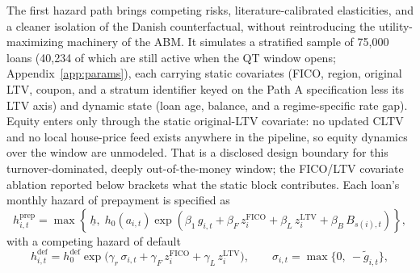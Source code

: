 \documentclass[12pt]{article}
\begin{document}
The first hazard path brings competing risks, literature-calibrated elasticities, and a cleaner isolation of the Danish counterfactual, without reintroducing the utility-maximizing machinery of the ABM. It simulates a stratified sample of 75,000 loans (40,234 of which are still active when the QT window opens; Appendix~\ref{app:params}), each carrying static covariates (FICO, region, original LTV, coupon, and a stratum identifier keyed on the Path A specification less its LTV axis) and dynamic state (loan age, balance, and a regime-specific rate gap). Equity enters only through the static original-LTV covariate: no updated CLTV and no local house-price feed exists anywhere in the pipeline, so equity dynamics over the window are unmodeled. That is a disclosed design boundary for this turnover-dominated, deeply out-of-the-money window; the FICO/LTV covariate ablation reported below brackets what the static block contributes. Each loan's monthly hazard of prepayment is specified as
\begin{equation}\label{eq:pathB}
h^{\mathrm{prep}}_{i,t} = \max\!\left\{\, \underline{h},\; h_0\!\left(a_{i,t}\right) \exp\!\left( \beta_1\, g_{i,t} + \beta_F\, z^{\mathrm{FICO}}_{i} + \beta_L\, z^{\mathrm{LTV}}_{i} + \beta_B\, B_{s(i),t} \right) \right\},
\end{equation}
with a competing hazard of default
\begin{equation}\label{eq:default}
h^{\mathrm{def}}_{i,t} = h^{\mathrm{def}}_0 \exp\!\big( \gamma_r\, \sigma_{i,t} + \gamma_F\, z^{\mathrm{FICO}}_{i} + \gamma_L\, z^{\mathrm{LTV}}_{i} \big), \qquad \sigma_{i,t} = \max\{0,\ -\tilde g_{i,t}\},
\end{equation}
\end{document}
